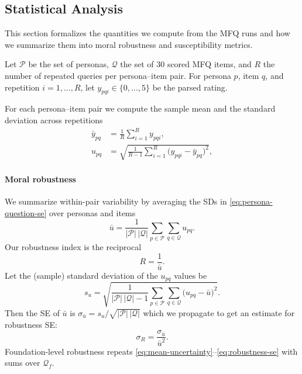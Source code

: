 \documentclass{article}
\begin{document}
\subsection{Statistical Analysis}



This section formalizes the quantities we compute from the MFQ runs and how we summarize them into moral robustness and susceptibility metrics.

Let \(\mathcal{P}\) be the set of personas, \(\mathcal{Q}\) the set of 30 scored MFQ items, and \(R\) the number of repeated queries per persona--item pair. For persona \(p\), item \(q\), and repetition \(i=1,\ldots,R\), let \(y_{pqi}\in\{0,\ldots,5\}\) be the parsed rating.

For each persona--item pair we compute the sample mean and the standard deviation across repetitions
\begin{align}
  \bar{y}_{pq} &= \frac{1}{R} \sum_{i=1}^{R} y_{pqi}, \label{eq:persona-question-mean}\\
  u_{pq} &= \sqrt{\frac{1}{R-1} \sum_{i=1}^{R} \big(y_{pqi} - \bar{y}_{pq}\big)^2}, \label{eq:persona-question-se}
\end{align}

\paragraph{Moral robustness} We summarize within-pair variability by averaging the SDs in \eqref{eq:persona-question-se} over personas and items
\begin{equation}
  \bar{u} = \frac{1}{|\mathcal{P}|\,|\mathcal{Q}|} \sum_{p \in \mathcal{P}} \sum_{q \in \mathcal{Q}} u_{pq}.\label{eq:mean-uncertainty}
\end{equation}
Our robustness index is the reciprocal
\begin{equation}
  R = \frac{1}{\bar{u}}.\label{eq:robustness}
\end{equation}
Let the (sample) standard deviation of the \(u_{pq}\) values be
\begin{equation}
  s_u = \sqrt{\frac{1}{|\mathcal{P}|\,|\mathcal{Q}| - 1} \sum_{p \in \mathcal{P}} \sum_{q \in \mathcal{Q}} \Big(u_{pq} - \bar{u}\Big)^2}.\label{eq:uncertainty-sd}
\end{equation}
Then the SE of \(\bar{u}\) is \(\sigma_{\bar{u}} = s_u / \sqrt{|\mathcal{P}|\,|\mathcal{Q}|}\) which we propagate to get an estimate for robustness SE:
\begin{equation}
  \sigma_R = \frac{\sigma_{\bar{u}}}{\bar{u}^2}.
  \label{eq:robustness-se}
\end{equation}
Foundation-level robustness repeats \eqref{eq:mean-uncertainty}--\eqref{eq:robustness-se} with sums over \(\mathcal{Q}_f\).
\end{document}
